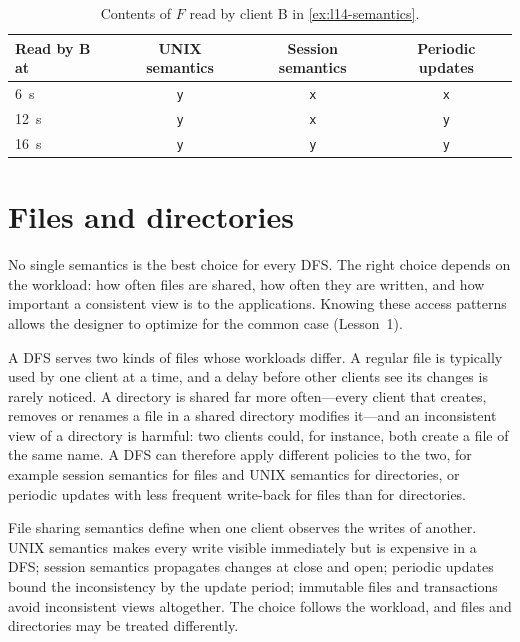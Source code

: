 \documentclass[../main.tex]{subfiles}
\begin{document}
\begin{table}[htbp]
  \centering
  \caption{Contents of $F$ read by client B in \cref{ex:l14-semantics}.}
  \label{tab:l14-semantics}
  \small
  \begin{tabular}{@{}lccc@{}}
    \toprule
    Read by B at & UNIX semantics & Session semantics & Periodic updates \\
    \midrule
    \SI{6}{\second}  & \texttt{y} & \texttt{x} & \texttt{x} \\
    \SI{12}{\second} & \texttt{y} & \texttt{x} & \texttt{y} \\
    \SI{16}{\second} & \texttt{y} & \texttt{y} & \texttt{y} \\
    \bottomrule
  \end{tabular}
\end{table}

\section{Files and directories}
\label{sec:l14-dirs}

No single semantics is the best choice for every DFS.  The right choice
depends on the workload: how often files are shared, how often they are
written, and how important a consistent view is to the applications.
Knowing these access patterns allows the designer to optimize for the
common case (Lesson~1).

A DFS serves two kinds of files whose workloads differ.  A regular file is
typically used by one client at a time, and a delay before other clients
see its changes is rarely noticed.  A directory is shared far more
often---every client that creates, removes or renames a file in a shared
directory modifies it---and an inconsistent view of a directory is
harmful: two clients could, for instance, both create a file of the same
name.  A DFS can therefore apply different policies to the two, for
example session semantics for files and UNIX semantics for directories,
or periodic updates with less frequent write-back for files than for
directories.

\begin{keypoint}
  File sharing semantics define when one client observes the writes of
  another.  UNIX semantics makes every write visible immediately but is
  expensive in a DFS; session semantics propagates changes at close and
  open; periodic updates bound the inconsistency by the update period;
  immutable files and transactions avoid inconsistent views altogether.
  The choice follows the workload, and files and directories may be
  treated differently.
\end{keypoint}
\end{document}
